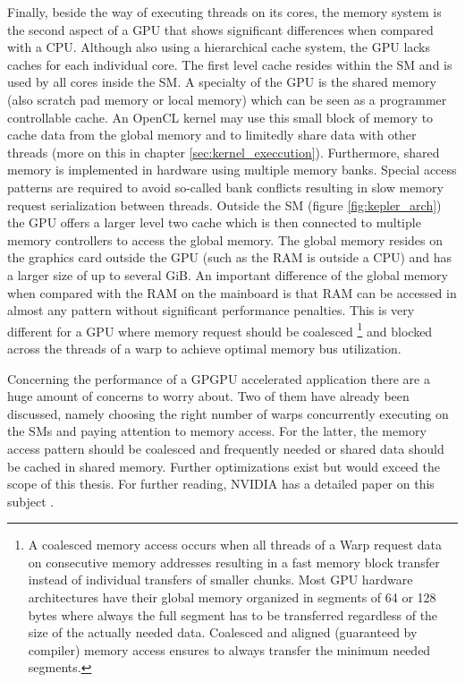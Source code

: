 Finally, beside the way of executing threads on its cores, the memory system is the second aspect of a GPU that shows significant differences when compared with a CPU. Although also using a hierarchical cache system, the GPU lacks caches for each individual core. The first level cache resides within the SM and is used by all cores inside the SM. A specialty of the GPU is the shared memory (also scratch pad memory or local memory) which can be seen as a programmer controllable cache. An OpenCL kernel may use this small block of memory to cache data from the global memory and to limitedly share data with other threads (more on this in chapter \ref{sec:kernel_execcution}). Furthermore, shared memory is implemented in hardware using multiple memory banks. Special access patterns are required to avoid so-called bank conflicts resulting in slow memory request serialization between threads. Outside the SM (figure \ref{fig:kepler_arch}) the GPU offers a larger level two cache which is then connected to multiple memory controllers to access the global memory. The global memory resides on the graphics card outside the GPU (such as the RAM is outside a CPU) and has a larger size of up to several GiB. An important difference of the global memory when compared with the RAM on the mainboard is that RAM can be accessed in almost any pattern without significant performance penalties. This is very different for a GPU where memory request should be coalesced \footnote{A coalesced memory access occurs when all threads of a Warp request data on consecutive memory addresses resulting in a fast memory block transfer instead of individual transfers of smaller chunks. Most GPU hardware architectures have their global memory organized in segments of 64 or 128 bytes where always the full segment has to be transferred regardless of the size of the actually needed data. Coalesced and aligned (guaranteed by compiler) memory access ensures to always transfer the minimum needed segments.} and blocked across the threads of a warp to achieve optimal memory bus utilization.

Concerning the performance of a GPGPU accelerated application there are a huge amount of concerns to worry about. Two of them have already been discussed, namely choosing the right number of warps concurrently executing on the SMs and paying attention to memory access. For the latter, the memory access pattern should be coalesced and frequently needed or shared data should be cached in shared memory. Further optimizations exist but would exceed the scope of this thesis. For further reading, NVIDIA has a detailed paper on this subject \cite{gpu_optimizations}.

